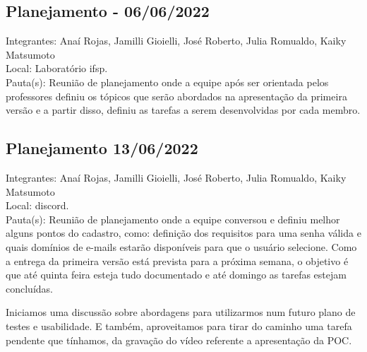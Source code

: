 \subsection{Planejamento - 06/06/2022}
\noindent Integrantes: Anaí Rojas, Jamilli Gioielli, José Roberto, Julia Romualdo, Kaiky Matsumoto \\
Local: Laboratório \acs{ifsp}. \\
Pauta(s): Reunião de planejamento onde a equipe após ser orientada pelos professores definiu os tópicos que serão abordados na apresentação da primeira versão e a partir disso, definiu as tarefas a serem desenvolvidas por cada membro.

\subsection{Planejamento 13/06/2022}
\noindent Integrantes: Anaí Rojas, Jamilli Gioielli, José Roberto, Julia Romualdo, Kaiky Matsumoto \\
Local: \gls{discord}. \\
Pauta(s): Reunião de planejamento onde a equipe conversou e definiu melhor alguns pontos do cadastro, como: definição dos requisitos para uma senha válida e quais domínios de e-mails estarão disponíveis para que o usuário selecione. Como a entrega da primeira versão está prevista para a próxima semana, o objetivo é que até quinta feira esteja tudo documentado e até domingo as tarefas estejam concluídas. 

\noindent Iniciamos uma discussão sobre abordagens para utilizarmos num futuro plano de testes e usabilidade. E também, aproveitamos para tirar do caminho uma tarefa pendente que tínhamos, da gravação do vídeo referente a apresentação da \acs{POC}.